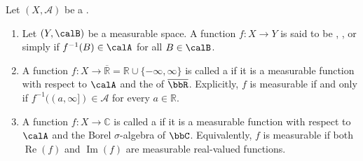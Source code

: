 \begin{definition} \label{definition:measurable_function_between_measure_spaces}
Let $(X, \mathcal{A})$ be a .

\begin{enumerate}
  \item Let $(Y,\calB)$ be a measurable space. A function $f: X \to Y$ is said to be , , or simply  if $f^{-1}(B) \in \calA$ for all $B \in \calB$.

  \item A function $f : X \to \overline{\mathbb{R}} = \mathbb{R} \cup \{-\infty, \infty\}$ is called a  if it is a measurable function with respect to $\calA$ and the  of $\overline{\bbR}$.
  Explicitly, $f$ is measurable if and only if $f^{-1}((a, \infty]) \in \mathcal{A}$ for every $a \in \mathbb{R}$.

  \item A function $f : X \to \mathbb{C}$ is called a  if it is a measurable function with respect to $\calA$ and the Borel $\sigma$-algebra of $\bbC$. Equivalently, $f$ is measurable if both $\operatorname{Re}(f)$ and $\operatorname{Im}(f)$ are measurable real-valued functions.
\end{enumerate}
\end{definition}
